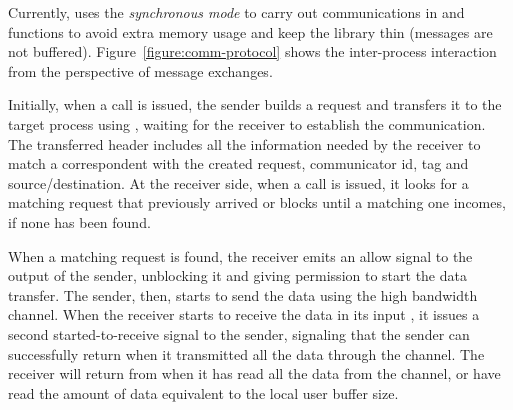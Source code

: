 	Currently, \lwmpi uses the \textit{synchronous mode} to carry out
	communications in \mpisend and \mpirecv functions
	to avoid extra memory usage and keep the library thin (\ie messages
	are not buffered). Figure~\ref{figure:comm-protocol} shows the
	inter-process interaction from the perspective of message exchanges.

	Initially, when a \mpisend call is issued, the
	sender builds a request and transfers it to the target process
	using \mailbox, waiting for the receiver to establish the communication.
	The transferred header includes all the information needed by the receiver
	to match a correspondent \mpirecv with the created request, \ie
	communicator id, tag and source/destination.
	At the receiver side, when a \mpirecv call is issued, it looks for a
	matching request that previously arrived or blocks until a matching
	one incomes, if none has been found.

	When a matching request is found, the receiver emits an allow signal
	to the output \portal of the sender, unblocking it and giving permission
	to start the data transfer. The sender, then, starts to send the data
	using the high bandwidth channel. When the receiver starts to receive the
	data in its input \portal, it issues a second started-to-receive signal
	to the sender, signaling that the sender can successfully return when it
	transmitted all the data through the channel.
	The receiver will return from \mpirecv when it has
	read all the data from the channel, or have read the amount of data
	equivalent to the local user buffer size.
